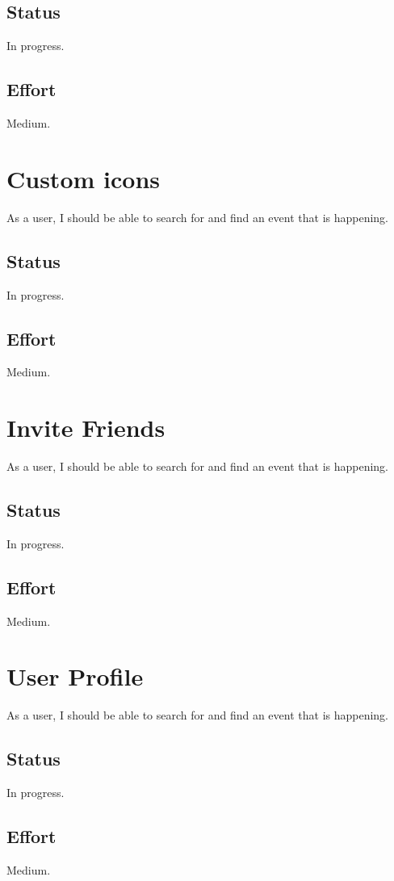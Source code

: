 \documentclass[10pt,a4paper]{article}
\begin{document}
\subsection{Status}
In progress.

\subsection{Effort}
Medium.

\section{Custom icons}
As a user, I should be able to search for and find an event that is happening.
\subsection{Status}
In progress.

\subsection{Effort}
Medium.

\section{Invite Friends}
As a user, I should be able to search for and find an event that is happening.
\subsection{Status}
In progress.

\subsection{Effort}
Medium.

\section{User Profile}
As a user, I should be able to search for and find an event that is happening.
\subsection{Status}
In progress.

\subsection{Effort}
Medium.
\end{document}
